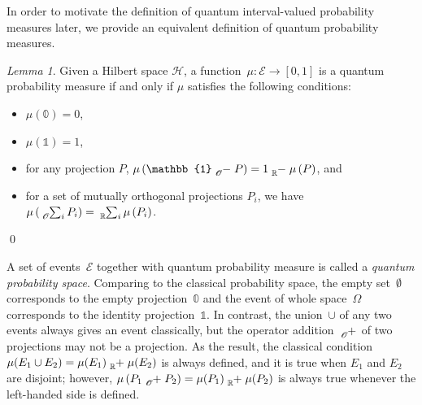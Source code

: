 \documentclass{article}
\theoremstyle{remark}
\newtheorem{lemma}{Lemma}
\newcommand{\events}{\ensuremath{\mathcal{E}}}
\newcommand{\pmeas}{\ensuremath{\mu}}
\newcommand{\Hilb}{\mathcal{H}}
\begin{document}
In order to motivate the definition of quantum interval-valued probability
measures later, we provide an equivalent definition of quantum probability
measures.

\begin{lemma}\label{lem:quantumProbabilityMeasure}Given a Hilbert
space $\Hilb$, a function~$\mu:\events\rightarrow[0,1]$ is a quantum probability
measure if and only if $\mu$ satisfies the following conditions:
\begin{itemize}
\item $\mu(\mathbb{0})=0$, 
\item $\mu(\mathbb{1})=1$, 
\item for any projection $P$,
$\mu\left(\mathbb{1}\tensor*[_{\mathscr{O}}]{-}{}P\right)=1\tensor*[_{\mathbb{R}}]{-}{}\mu\left(P\right)$, and 
\item for a set of mutually orthogonal projections $P_{i}$, we have
$\mu\left(\tensor*[_{\mathscr{O}}]{\sum}{_{i}}P_{i}\right)=\tensor*[_{\mathbb{R}}]{\sum}{_{i}}\mu\left(P_{i}\right)$.
\end{itemize}
\qed\end{lemma}

A set of events~$\events$ together with quantum probability measure is called a
\emph{quantum probability space}. 
Comparing to the classical probability space, the empty set~$\emptyset$
corresponds to the empty projection~$\mathbb{0}$ and the event of
whole space~$\Omega$ corresponds to the identity projection~$\mathbb{1}$.
In contrast, the union~$\cup$ of any two events always gives an
event classically, but the operator addition~$\tensor*[_{\mathscr{O}}]{+}{}$
of two projections may not be a projection. As the result, the classical
condition~$\pmeas(E_{1}\cup E_{2})=\pmeas(E_{1})\tensor*[_{\mathbb{R}}]{+}{}\pmeas(E_{2})$
is always defined, and it is true when $E_{1}$ and $E_{2}$ are disjoint;
however, $\mu\left(P_{1}\tensor*[_{\mathscr{O}}]{+}{}P_{2}\right)=\mu(P_{1})\tensor*[_{\mathbb{R}}]{+}{}\mu(P_{2})$
is always true whenever the left-handed side is defined.
\end{document}
